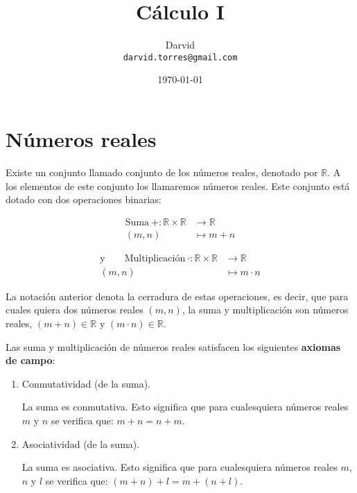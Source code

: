 \documentclass[11pt]{article}
\newcommand{\R}{\mathbb{R}}
\begin{document}
\title{\vspace{-2cm}Cálculo I}
\author{Darvid \\ \texttt{darvid.torres@gmail.com}}
\date{\today}
\maketitle
\thispagestyle{empty}

\section*{Números reales}

Existe un conjunto llamado conjunto de los números reales, denotado por $\R$. A los elementos de este conjunto los llamaremos números reales. Este conjunto está dotado con dos operaciones binarias:\vspace{-0.5cm}
\begin{center}
\noindent\begin{minipage}[r]{5.5cm}
\begin{align*}
    \text{Suma} \ + : \R \times \R &\to \R\\
    (m,n) &\mapsto m+n
\end{align*}
\end{minipage}%
\begin{minipage}[l]{6.5cm}
\begin{align*}
    \text{y} \qquad \text{Multiplicación} \ \cdot : \R \times \R &\to \R\\
    (m,n) &\mapsto m \cdot n
\end{align*}
\end{minipage}
\end{center}

La notación anterior denota la cerradura de estas operaciones, es decir, que para cuales quiera dos números reales $(m,n)$, la suma y multiplicación son números reales, $(m+n)\in \R$ y $(m\cdot n)\in \R$.

Las suma y multiplicación de números reales satisfacen los siguientes \textbf{axiomas de campo}:

\begin{enumerate}[label=S\arabic*.]
    \item Conmutatividad (de la suma).
    
    La suma es conmutativa. Esto significa que para cualesquiera números reales $m$ y $n$ se verifica que: $ m+n = n+m $.
    \item Asociatividad (de la suma).
    
    La suma es asociativa. Esto significa que para cualesquiera números reales $m$, $n$ y $l$ se verifica que: $(m+ n)+l = m+(n+ l)$.
\end{enumerate}
\end{document}
